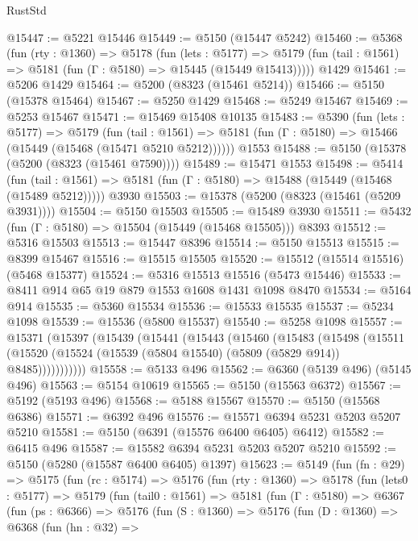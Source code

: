 \begin{lexlean}{RustStd}
\begin{coremodule}
@15447 := @5221 @15446
@15449 := @5150 (@15447 @5242)
@15460 := @5368
    (fun (rty : @1360) =>
    @5178
      (fun (lets : @5177) =>
      @5179 (fun (tail : @1561) => @5181 (fun (Γ : @5180) => @15445 (@15449 @15413)))))
    @1429
@15461 := @5206 @1429
@15464 := @5200 (@8323 (@15461 @5214))
@15466 := @5150 (@15378 @15464)
@15467 := @5250 @1429
@15468 := @5249 @15467
@15469 := @5253 @15467
@15471 := @15469 @15408 @10135
@15483 := @5390
    (fun (lets : @5177) =>
    @5179
      (fun (tail : @1561) =>
      @5181 (fun (Γ : @5180) => @15466 (@15449 (@15468 (@15471 @5210 @5212))))))
    @1553
@15488 := @5150 (@15378 (@5200 (@8323 (@15461 @7590))))
@15489 := @15471 @1553
@15498 := @5414
    (fun (tail : @1561) => @5181 (fun (Γ : @5180) => @15488 (@15449 (@15468 (@15489 @5212)))))
    @3930
@15503 := @15378 (@5200 (@8323 (@15461 (@5209 @3931))))
@15504 := @5150 @15503
@15505 := @15489 @3930
@15511 := @5432 (fun (Γ : @5180) => @15504 (@15449 (@15468 @15505))) @8393
@15512 := @5316 @15503
@15513 := @15447 @8396
@15514 := @5150 @15513
@15515 := @8399 @15467
@15516 := @15515 @15505
@15520 := @15512 (@15514 @15516) (@5468 @15377)
@15524 := @5316 @15513 @15516 (@5473 @15446)
@15533 := @8411 @914 @65 @19 @879 @1553 @1608 @1431 @1098 @8470
@15534 := @5164 @914
@15535 := @5360 @15534
@15536 := @15533 @15535
@15537 := @5234 @1098
@15539 := @15536 (@5800 @15537)
@15540 := @5258 @1098
@15557 := @15371
    (@15397
      (@15439
        (@15441
          (@15443
            (@15460
              (@15483
                (@15498
                  (@15511
                    (@15520 (@15524 (@15539 (@5804 @15540) (@5809 (@5829 @914)) @8485)))))))))))
@15558 := @5133 @496
@15562 := @6360 (@5139 @496) (@5145 @496)
@15563 := @5154 @10619
@15565 := @5150 (@15563 @6372)
@15567 := @5192 (@5193 @496)
@15568 := @5188 @15567
@15570 := @5150 (@15568 @6386)
@15571 := @6392 @496
@15576 := @15571 @6394 @5231 @5203 @5207 @5210
@15581 := @5150 (@6391 (@15576 @6400 @6405) @6412)
@15582 := @6415 @496
@15587 := @15582 @6394 @5231 @5203 @5207 @5210
@15592 := @5150 (@5280 (@15587 @6400 @6405) @1397)
@15623 := @5149
    (fun (fn : @29) =>
    @5175
      (fun (rc : @5174) =>
      @5176
        (fun (rty : @1360) =>
        @5178
          (fun (lets0 : @5177) =>
          @5179
            (fun (tail0 : @1561) =>
            @5181
              (fun (Γ : @5180) =>
              @6367
                (fun (ps : @6366) =>
                @5176
                  (fun (S : @1360) =>
                  @5176
                    (fun (D : @1360) =>
                    @6368
                      (fun (hn : @32) =>

\end{coremodule}
\end{lexlean}
